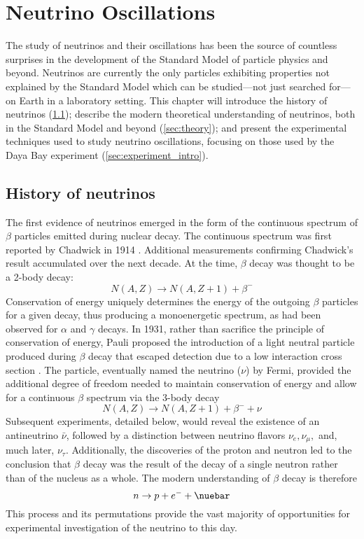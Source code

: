 \chapter{Neutrino Oscillations}
\label{ch:intro}

The study of neutrinos and their oscillations has been the source
of countless surprises in the development of the
Standard Model of particle physics and beyond.
Neutrinos are currently the only particles exhibiting properties
not explained by the Standard Model
which can be studied---not just searched for---on Earth in a laboratory setting.
This chapter will introduce the history of neutrinos (\cref{sec:history});
describe the modern theoretical understanding of neutrinos,
both in the Standard Model and beyond (\cref{sec:theory});
and present the experimental techniques used to study neutrino oscillations,
focusing on those used by the Daya Bay experiment (\cref{sec:experiment_intro}).


\section{History of neutrinos}
\label{sec:history}

The first evidence of neutrinos emerged in the form of
the continuous spectrum of $\beta$ particles
emitted during nuclear decay.
The continuous spectrum was first reported by Chadwick in 1914 \cite{chadwick_beta}.
Additional measurements confirming Chadwick's result accumulated over the next decade.
At the time, $\beta$ decay was thought to be a 2-body decay:
\begin{equation}\label{eq:old_beta}
    N(A, Z) \to N(A, Z+1) + \beta^-
\end{equation}
Conservation of energy uniquely determines the energy
of the outgoing $\beta$ particles for a given decay,
thus producing a monoenergetic spectrum,
as had been observed for $\alpha$ and $\gamma$ decays.
In 1931, rather than sacrifice the principle of conservation of energy,
Pauli proposed the introduction of a light neutral particle
produced during $\beta$ decay that escaped detection
due to a low interaction cross section \cite{pauli_letter}.
The particle, eventually named the neutrino ($\nu$) by Fermi,
provided the additional degree of freedom needed
to maintain conservation of energy and allow for a continuous $\beta$ spectrum
via the 3-body decay
\begin{equation}\label{eq:beta_mid}
    N(A, Z) \to N(A, Z+1) + \beta^- + \nu
\end{equation}
Subsequent experiments, detailed below,
would reveal the existence of an antineutrino $\bar{\nu}$,
followed by a distinction between neutrino flavors $\nu_e, \nu_\mu,$
and, much later, $\nu_\tau$.
Additionally, the discoveries of the proton and neutron
led to the conclusion that $\beta$ decay was the result of
the decay of a single neutron rather than of the nucleus as a whole.
The modern understanding of $\beta$ decay is therefore
\begin{equation}\label{eq:beta_modern}
    n \to p + e^- + \nuebar
\end{equation}
This process and its permutations
provide the vast majority of opportunities for
experimental investigation of the neutrino to this day.

